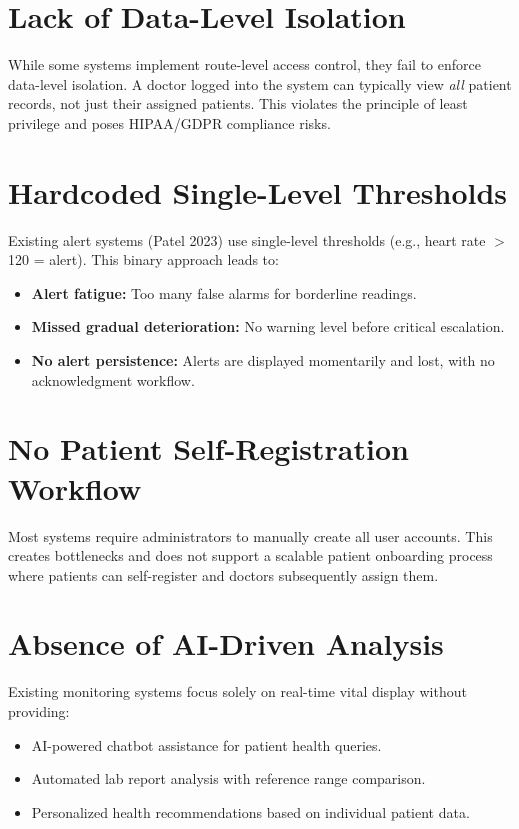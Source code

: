 \documentclass[12pt,a4paper]{report}
\begin{document}
\section{Lack of Data-Level Isolation}
While some systems implement route-level access control, they fail to enforce data-level isolation. A doctor logged into the system can typically view \textit{all} patient records, not just their assigned patients. This violates the principle of least privilege and poses HIPAA/GDPR compliance risks.

\section{Hardcoded Single-Level Thresholds}
Existing alert systems (Patel 2023) use single-level thresholds (e.g., heart rate $>$ 120 = alert). This binary approach leads to:
\begin{itemize}[leftmargin=*]
    \item \textbf{Alert fatigue:} Too many false alarms for borderline readings.
    \item \textbf{Missed gradual deterioration:} No warning level before critical escalation.
    \item \textbf{No alert persistence:} Alerts are displayed momentarily and lost, with no acknowledgment workflow.
\end{itemize}

\section{No Patient Self-Registration Workflow}
Most systems require administrators to manually create all user accounts. This creates bottlenecks and does not support a scalable patient onboarding process where patients can self-register and doctors subsequently assign them.

\section{Absence of AI-Driven Analysis}
Existing monitoring systems focus solely on real-time vital display without providing:
\begin{itemize}[leftmargin=*]
    \item AI-powered chatbot assistance for patient health queries.
    \item Automated lab report analysis with reference range comparison.
    \item Personalized health recommendations based on individual patient data.
\end{itemize}
\end{document}
